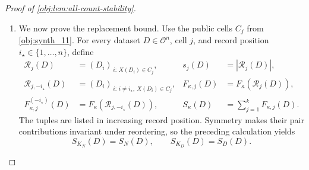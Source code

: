\begin{proof}[Proof of \cref{obj:lem:all-count-stability}]
\begin{enumerate}
The unit bounds on the kernels imply
\[
\left|\sum_{i<i'}\kappa(o_i,o_{i'})\right|
\le\sum_{i<i'}|\kappa(o_i,o_{i'})|
\le\binom{s}{2},
\qquad
|F_\kappa(\mathscr R)|\le s.
\]
For \(s\ge2\), separating the pairs involving an appended record \(o\in\mathcal O\) gives the exact identity
\[
F_\kappa(o_1,\ldots,o_s,o)-F_\kappa(o_1,\ldots,o_s)
=
\frac2s\sum_{i=1}^s\kappa(o_i,o)
-\frac{F_\kappa(o_1,\ldots,o_s)}s.
\]
Consequently,
\[
\begin{aligned}
\left|F_\kappa(o_1,\ldots,o_s,o)-F_\kappa(o_1,\ldots,o_s)\right|
&\le\frac2s\left|\sum_{i=1}^s\kappa(o_i,o)\right|
+\frac{|F_\kappa(o_1,\ldots,o_s)|}{s}\\
&\le\frac2s\,s+\frac{s}{s}=3.
\end{aligned}
\]
For the remaining occupancies, the defining formulas give
\[
F_\kappa(o)-F_\kappa(\varnothing)=0,
\qquad
F_\kappa(o_1,o)-F_\kappa(o_1)=2\kappa(o_1,o),
\]
so the respective absolute increments are zero and at most \(2\le3\). Thus, at every occupancy, each scalar insertion increment is at most \(3\), and the sum of the two absolute insertion increments is at most \(6\).

\item We now prove the replacement bound. Use the public cells \(C_j\) from \cref{obj:synth_11}. For every dataset \(D\in\mathcal O^n\), cell \(j\), and record position \(i_\star\in\{1,\ldots,n\}\), define
\[
\begin{aligned}
\mathscr R_j(D)&=(D_i)_{\,i:\,X(D_i)\in C_j},
&
s_j(D)&=|\mathscr R_j(D)|,\\
\mathscr R_{j,-i_\star}(D)
&=(D_i)_{\,i:\,i\ne i_\star,\ X(D_i)\in C_j},
&
F_{\kappa,j}(D)&=F_\kappa(\mathscr R_j(D)),\\
F_{\kappa,j}^{(-i_\star)}(D)
&=F_\kappa(\mathscr R_{j,-i_\star}(D)),
&
S_\kappa(D)&=\sum_{j=1}^kF_{\kappa,j}(D).
\end{aligned}
\]
The tuples are listed in increasing record position. Symmetry makes their pair contributions invariant under reordering, so the preceding calculation yields
\[
S_{K_N}(D)=S_N(D),\qquad S_{K_D}(D)=S_D(D).
\]


\end{enumerate}
\end{proof}

